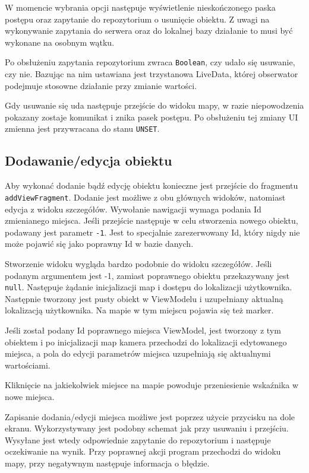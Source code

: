 \documentclass[polish,polish,a4paper,12pt]{article}
\begin{document}
	W momencie wybrania opcji następuje wyświetlenie nieskończonego paska postępu oraz zapytanie do repozytorium o usunięcie obiektu. Z uwagi na wykonywanie zapytania do serwera oraz do lokalnej bazy działanie to musi być wykonane na osobnym wątku.

	Po obsłużeniu zapytania repozytorium zwraca \texttt{Boolean}, czy udało się usuwanie, czy nie. Bazując na nim ustawiana jest trzystanowa LiveData, której obserwator podejmuje stosowne działanie przy zmianie wartości.

	Gdy usuwanie się uda następuje przejście do widoku mapy, w razie niepowodzenia pokazany zostaje komunikat i znika pasek postępu. Po obsłużeniu tej zmiany UI zmienna jest przywracana do stanu \texttt{UNSET}.

	\subsection{Dodawanie/edycja obiektu}

	Aby wykonać dodanie bądź edycję obiektu konieczne jest przejście do fragmentu \texttt{addViewFragment}. Dodanie jest możliwe z obu głównych widoków, natomiast edycja z widoku szczegółów. Wywołanie nawigacji wymaga podania Id zmienianego miejsca. Jeśli przejście następuje w celu stworzenia nowego obiektu, podawany jest parametr \texttt{-1}. Jest to specjalnie zarezerwowany Id, który nigdy nie może pojawić się jako poprawny Id w bazie danych.

	Stworzenie widoku wygląda bardzo podobnie do widoku szczegółów. Jeśli podanym argumentem jest -1, zamiast poprawnego obiektu przekazywany jest \texttt{null}. Następuje żądanie inicjalizacji map i dostępu do lokalizacji użytkownika. Następnie tworzony jest pusty obiekt w ViewModelu i uzupełniany aktualną lokalizacją użytkownika. Na mapie w tym miejscu pojawia się też marker.

	Jeśli został podany Id poprawnego miejsca ViewModel, jest tworzony z tym obiektem i po inicjalizacji map kamera przechodzi do lokalizacji edytowanego miejsca, a pola do edycji parametrów miejsca uzupełniają się aktualnymi wartościami.

	Kliknięcie na jakiekolwiek miejsce na mapie powoduje przeniesienie wskaźnika w nowe miejsca.

	Zapisanie dodania/edycji miejsca możliwe jest poprzez użycie przycisku na dole ekranu. Wykorzystywany jest podobny schemat jak przy usuwaniu i przejściu. Wysyłane jest wtedy odpowiednie zapytanie do repozytorium i następuje oczekiwanie na wynik. Przy poprawnej akcji program przechodzi do widoku mapy, przy negatywnym następuje informacja o błędzie.
\end{document}

